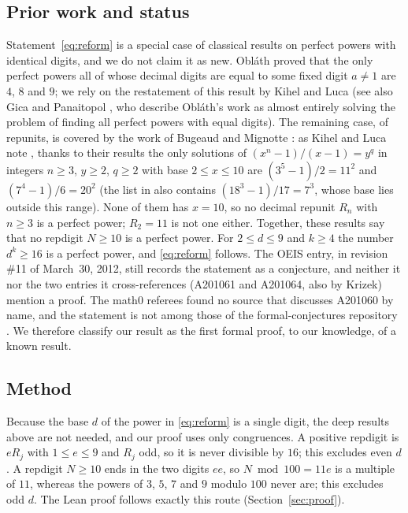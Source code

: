 \documentclass[11pt]{amsart}
\theoremstyle{plain}
\theoremstyle{definition}
\begin{document}
\subsection*{Prior work and status}
Statement~\eqref{eq:reform} is a special case of classical results on perfect powers with identical digits, and we do not claim it as new.
Obl\'ath \cite{Obl56} proved that the only perfect powers all of whose decimal digits are equal to some fixed digit $a\ne1$ are $4$, $8$ and $9$; we rely on the restatement of this result by Kihel and Luca \cite[Introduction]{KL05} (see also Gica and Panaitopol \cite{GP03}, who describe Obl\'ath's work as almost entirely solving the problem of finding all perfect powers with equal digits).
The remaining case, of repunits, is covered by the work of Bugeaud and Mignotte \cite{BM99}: as Kihel and Luca note \cite[Introduction]{KL05}, thanks to their results the only solutions of $(x^n-1)/(x-1)=y^q$ in integers $n\ge3$, $y\ge2$, $q\ge2$ with base $2\le x\le10$ are $(3^5-1)/2=11^2$ and $(7^4-1)/6=20^2$ (the list in \cite{KL05} also contains $(18^3-1)/17=7^3$, whose base lies outside this range). None of them has $x=10$, so no decimal repunit $R_n$ with $n\ge3$ is a perfect power; $R_2=11$ is not one either.
Together, these results say that no repdigit $N\ge10$ is a perfect power. For $2\le d\le9$ and $k\ge4$ the number $d^k\ge16$ is a perfect power, and \eqref{eq:reform} follows.
The OEIS entry, in revision \#11 of March~30, 2012, still records the statement as a conjecture, and neither it nor the two entries it cross-references (A201061 and A201064, also by Krizek) mention a proof. The math0 referees found no source that discusses A201060 by name, and the statement is not among those of the formal-conjectures repository \cite{FC}.
We therefore classify our result as the first formal proof, to our knowledge, of a known result.

\subsection*{Method}
Because the base $d$ of the power in \eqref{eq:reform} is a single digit, the deep results above are not needed, and our proof uses only congruences. A positive repdigit is $eR_j$ with $1\le e\le9$ and $R_j$ odd, so it is never divisible by $16$; this excludes even $d$. A repdigit $N\ge10$ ends in the two digits $ee$, so $N\bmod 100=11e$ is a multiple of $11$, whereas the powers of $3$, $5$, $7$ and $9$ modulo $100$ never are; this excludes odd $d$.
The Lean proof follows exactly this route (Section~\ref{sec:proof}).
\end{document}
